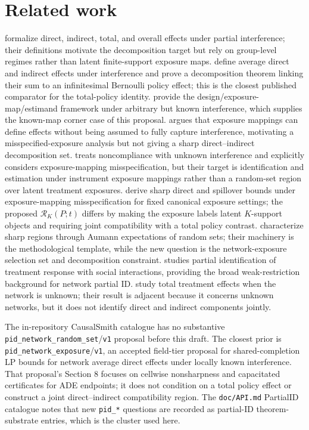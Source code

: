 \documentclass[11pt]{article}
\theoremstyle{definition}
\theoremstyle{plain}
\theoremstyle{remark}
\begin{document}
\section{Related work}
\citet{HudgensHalloran2008} formalize direct, indirect, total, and overall
effects under partial interference; their definitions motivate the
decomposition target but rely on group-level regimes rather than latent
finite-support exposure maps.  \citet{HuLiWager2022} define average direct and
indirect effects under interference and prove a decomposition theorem linking
their sum to an infinitesimal Bernoulli policy effect; this is the closest
published comparator for the total-policy identity.  \citet{AronowSamii2017}
provide the design/exposure-map/estimand framework under arbitrary but known
interference, which supplies the known-map corner case of this proposal.
\citet{Savje2024} argues that exposure mappings can define effects without
being assumed to fully capture interference, motivating a misspecified-exposure
analysis but not giving a sharp direct--indirect decomposition set.
\citet{HoshinoYanagi2024} treats noncompliance with unknown interference and
explicitly considers exposure-mapping misspecification, but their target is
identification and estimation under instrument exposure mappings rather than a
random-set region over latent treatment exposures.  \citet{SchroderOprescuFeuerriegelKallus2026}
derive sharp direct and spillover bounds under exposure-mapping misspecification
for fixed canonical exposure settings; the proposed \(\mathcal R_K(P;t)\)
differs by making the exposure labels latent \(K\)-support objects and requiring
joint compatibility with a total policy contrast.  \citet{BeresteanuMolchanovMolinari2011}
characterize sharp regions through Aumann expectations of random sets; their
machinery is the methodological template, while the new question is the
network-exposure selection set and decomposition constraint.  \citet{Manski2013}
studies partial identification of treatment response with social interactions,
providing the broad weak-restriction background for network partial ID.
\citet{YuAiroldiBorgsChayes2022} study total treatment effects when the network
is unknown; their result is adjacent because it concerns unknown networks, but
it does not identify direct and indirect components jointly.

The in-repository CausalSmith catalogue has no substantive
\texttt{pid\_network\_random\_set}/\texttt{v1} proposal before this draft.
The closest prior is \texttt{pid\_network\_exposure}/\texttt{v1}, an accepted
field-tier proposal for shared-completion LP bounds for network average direct
effects under locally known interference.  That proposal's Section 8 focuses on
cellwise nonsharpness and capacitated certificates for ADE endpoints; it does
not condition on a total policy effect or construct a joint direct--indirect
compatibility region.  The \texttt{doc/API.md} PartialID catalogue notes that
new \texttt{pid\_*} questions are recorded as partial-ID theorem-substrate
entries, which is the cluster used here.
\end{document}
